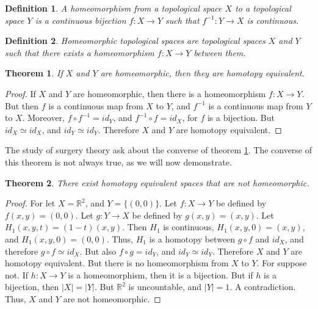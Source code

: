 \documentclass{article}
\theoremstyle{mystyle}
\newtheorem{theorem}{Theorem}[section]
\newtheorem{definition}{Definition}[section]
\begin{document}
\begin{definition}
A homeomorphism from a topological space $X$ to a topological space $Y$ is a continuous bijection $f:X\rightarrow Y$ such that $f^{-1}:Y\rightarrow X$ is continuous.
\end{definition}
\begin{definition}
Homeomorphic topological spaces are topological spaces $X$ and $Y$ such that there exists a homeomorphism $f:X\rightarrow Y$ between them.
\end{definition}
\begin{theorem}
\label{theorem:surgery_theory_homeomorphic_implies_homotopy_equivalent}
If $X$ and $Y$ are homeomorphic, then they are homotopy equivalent.
\end{theorem}
\begin{proof}
If $X$ and $Y$ are homeomorphic, then there is a homeomorphism $f:X\rightarrow Y$. But then $f$ is a continuous map from $X$ to $Y$, and $f^{-1}$ is a continuous map from $Y$ to $X$. Moreover, $f\circ f^{-1} = id_{Y}$, and $f^{-1}\circ f = id_{X}$, for $f$ is a bijection. But $id_{X}\simeq id_{X}$, and $id_{Y}\simeq id_{Y}$. Therefore $X$ and $Y$ are homotopy equivalent.
\end{proof}
The study of surgery theory ask about the converse of theorem \ref{theorem:surgery_theory_homeomorphic_implies_homotopy_equivalent}. The converse of this theorem is not always true, as we will now demonstrate.
\begin{theorem}
\label{theorem:surgery_theory_homotopic_does_not_imply_homeomorphic}
There exist homotopy equivalent spaces that are not homeomorphic.
\end{theorem}
\begin{proof}
For let $X=\mathbb{R}^{2}$, and $Y = \{(0,0)\}$. Let $f:X\rightarrow Y$ be defined by $f(x,y) = (0,0)$. Let $g:Y\rightarrow X$ be defined by $g(x,y) = (x,y)$. Let $H_1(x,y,t) = (1-t)(x,y)$. Then $H_{1}$ is continuous, $H_{1}(x,y,0) = (x,y)$, and $H_{1}(x,y,0) = (0,0)$. Thus, $H_{1}$ is a homotopy between $g\circ f$ and $id_{X}$, and therefore $g\circ f \simeq id_{X}$. But also $f\circ g = id_{Y}$, and $id_{Y}\simeq id_{Y}$. Therefore $X$ and $Y$ are homotopy equivalent. But there is no homeomorphism from $X$ to $Y$. For suppose not. If $h:X\rightarrow Y$ is a homeomorphism, then it is a bijection. But if $h$ is a bijection, then $|X| = |Y|$. But $\mathbb{R}^2$ is uncountable, and $|Y| = 1$. A contradiction. Thus, $X$ and $Y$ are not homeomorphic.
\end{proof}
\end{document}
